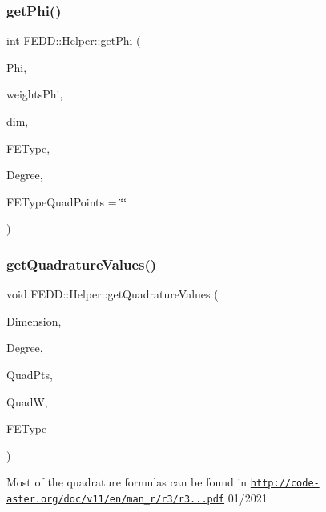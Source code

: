 \subsubsection{\texorpdfstring{get\+Phi()}{getPhi()}}
{\footnotesize\ttfamily int F\+E\+D\+D\+::\+Helper\+::get\+Phi (\begin{DoxyParamCaption}\item[{vec2\+D\+\_\+dbl\+\_\+ptr\+\_\+\+Type \&}]{Phi,  }\item[{vec\+\_\+dbl\+\_\+ptr\+\_\+\+Type \&}]{weights\+Phi,  }\item[{int}]{dim,  }\item[{std\+::string}]{F\+E\+Type,  }\item[{int}]{Degree,  }\item[{std\+::string}]{F\+E\+Type\+Quad\+Points = {\ttfamily \char`\"{}\char`\"{}} }\end{DoxyParamCaption})\hspace{0.3cm}{\ttfamily [static]}}

\mbox{\label{classFEDD_1_1Helper_afed2032e131e00f658402817f66d9cfd}} 
\subsubsection{\texorpdfstring{get\+Quadrature\+Values()}{getQuadratureValues()}}
{\footnotesize\ttfamily void F\+E\+D\+D\+::\+Helper\+::get\+Quadrature\+Values (\begin{DoxyParamCaption}\item[{int}]{Dimension,  }\item[{int}]{Degree,  }\item[{vec2\+D\+\_\+dbl\+\_\+ptr\+\_\+\+Type \&}]{Quad\+Pts,  }\item[{vec\+\_\+dbl\+\_\+ptr\+\_\+\+Type \&}]{QuadW,  }\item[{std\+::string}]{F\+E\+Type }\end{DoxyParamCaption})\hspace{0.3cm}{\ttfamily [static]}}

Most of the quadrature formulas can be found in \href{http://code-aster.org/doc/v11/en/man_r/r3/r3.01.01.pdf}{\tt http\+://code-\/aster.\+org/doc/v11/en/man\+\_\+r/r3/r3...\+pdf} 01/2021 \mbox{\label{classFEDD_1_1Helper_a86db0eff29bd3d7e6d7853436a9e5e37}} 
